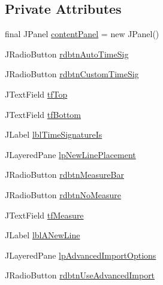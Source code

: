 \subsection*{Private Attributes}
\begin{DoxyCompactItemize}
\item 
final J\+Panel \hyperlink{classcom_1_1lclion_1_1midigui_1_1_dialog_preferences_ac383c7b38c74b9e1cc245a00de4fbb5e}{content\+Panel} = new J\+Panel()
\item 
J\+Radio\+Button \hyperlink{classcom_1_1lclion_1_1midigui_1_1_dialog_preferences_aa403bc56221bd1af763dbf31f90a8902}{rdbtn\+Auto\+Time\+Sig}
\item 
J\+Radio\+Button \hyperlink{classcom_1_1lclion_1_1midigui_1_1_dialog_preferences_ad09e056f314ee875a2c70236299d5633}{rdbtn\+Custom\+Time\+Sig}
\item 
J\+Text\+Field \hyperlink{classcom_1_1lclion_1_1midigui_1_1_dialog_preferences_a1df6442c69813ef29777fef773a4c0f9}{tf\+Top}
\item 
J\+Text\+Field \hyperlink{classcom_1_1lclion_1_1midigui_1_1_dialog_preferences_ad2edc1b54d80700468be7da4535d3fc3}{tf\+Bottom}
\item 
J\+Label \hyperlink{classcom_1_1lclion_1_1midigui_1_1_dialog_preferences_a992b76652c560915d4f052a8718a72dd}{lbl\+Time\+Signature\+Is}
\item 
J\+Layered\+Pane \hyperlink{classcom_1_1lclion_1_1midigui_1_1_dialog_preferences_af502e5d406164d232cafc3abdee20dbd}{lp\+New\+Line\+Placement}
\item 
J\+Radio\+Button \hyperlink{classcom_1_1lclion_1_1midigui_1_1_dialog_preferences_a541603f796912a6a5e40a885d18c2b6d}{rdbtn\+Measure\+Bar}
\item 
J\+Radio\+Button \hyperlink{classcom_1_1lclion_1_1midigui_1_1_dialog_preferences_a4a8eba2702fef7e4d27fa65343a9c637}{rdbtn\+No\+Measure}
\item 
J\+Text\+Field \hyperlink{classcom_1_1lclion_1_1midigui_1_1_dialog_preferences_a66ef301f8f1ef71c2843bb6c2669a86c}{tf\+Measure}
\item 
J\+Label \hyperlink{classcom_1_1lclion_1_1midigui_1_1_dialog_preferences_a923dbec9d9737f58a391ded48df38504}{lbl\+A\+New\+Line}
\item 
J\+Layered\+Pane \hyperlink{classcom_1_1lclion_1_1midigui_1_1_dialog_preferences_a03355431be865e450f20710c67681712}{lp\+Advanced\+Import\+Options}
\item 
J\+Radio\+Button \hyperlink{classcom_1_1lclion_1_1midigui_1_1_dialog_preferences_aaae7fc9e14a38f469e6893b83d5f612c}{rdbtn\+Use\+Advanced\+Import}

\end{DoxyCompactItemize}
